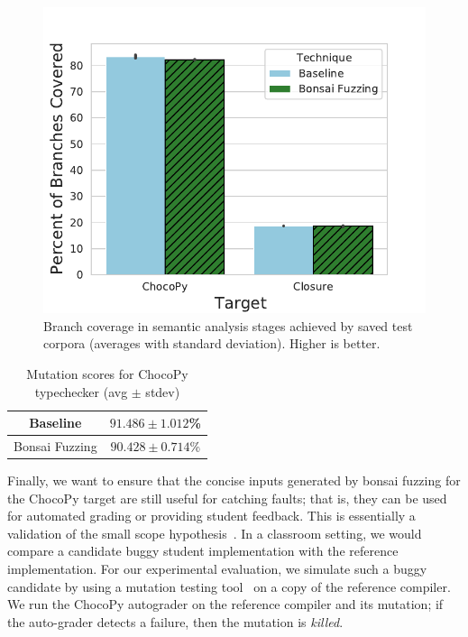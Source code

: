 \documentclass[conference]{IEEEtran}
\newcommand{\tech}{bonsai fuzzing} \newcommand{\Tech}{Bonsai fuzzing} \newcommand{\TECH}{Bonsai Fuzzing}
\begin{document}
\begin{figure}[t]
    \centering
    \includegraphics[scale=0.5]{branch_cov.pdf}
    \caption{Branch coverage in semantic analysis stages achieved by saved test corpora (averages with standard deviation). Higher is better.}
    \label{fig:branch-cov}
    \vspace{-0.3cm}
\end{figure}
\begin{table}
    \centering
    \caption{Mutation scores for ChocoPy typechecker (avg $\pm$ stdev)}
    \label{tab:chocopy-mutation-scores}
    \begin{tabular}{ |c||c|  }
     \hline
        Baseline & $91.486 \pm 1.012$\%\\
        \hline
        \TECH{} & $90.428 \pm 0.714$\% \\
        \hline
    \end{tabular}
\vspace{-0.5cm}
\end{table}

Finally, we want to ensure that the concise inputs generated by \tech{} for the ChocoPy target are still useful for catching faults; that is, they can be used for automated grading or providing student feedback. This is essentially a validation of the small scope hypothesis~\cite{Jackson12}.
In a classroom setting, we would compare a candidate buggy student implementation with the reference implementation. For our experimental evaluation, we simulate such a buggy candidate by using a mutation testing tool~\cite{PITest} on a copy of the reference compiler. We run the ChocoPy autograder on the reference compiler and its mutation; if the auto-grader detects a failure, then the mutation is \emph{killed}.
\end{document}

